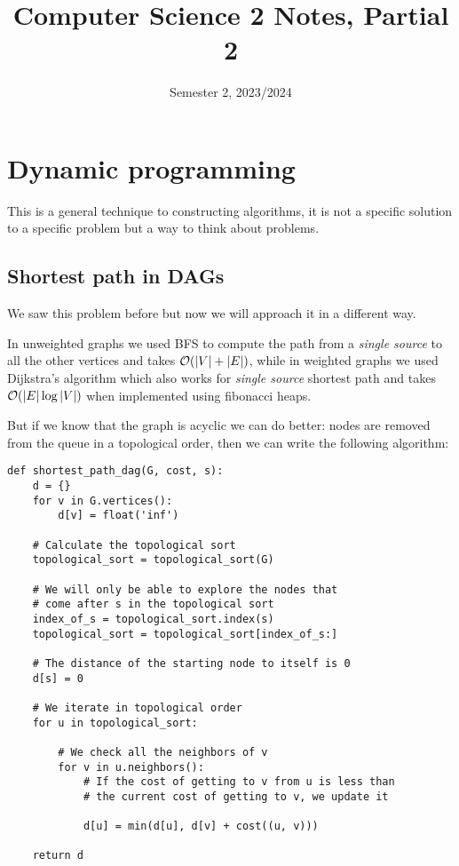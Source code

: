 \documentclass[14pt]{extarticle}
\title{Computer Science 2 Notes, Partial 2}
\date{Semester 2, 2023/2024}
\begin{document}
\maketitle
\tableofcontents
\clearpage

\section{Dynamic programming}

This is a general technique to constructing algorithms, it is not a specific solution to a specific problem but a way to think about problems.

\subsection{Shortest path in DAGs}

We saw this problem before but now we will approach it in a different way.

In unweighted graphs we used BFS to compute the path from a \textit{single source} to all the other vertices and takes $\mathcal{O}(|V| + |E|)$, while in weighted graphs we used Dijkstra's algorithm which also works for \textit{single source} shortest path and takes $\mathcal{O}(|E| \log |V|)$ when implemented using fibonacci heaps.

But if we know that the graph is acyclic we can do better: nodes are removed from the queue in a topological order, then we can write the following algorithm:

\begin{verbatim}
def shortest_path_dag(G, cost, s):
    d = {}
    for v in G.vertices():
        d[v] = float('inf')

    # Calculate the topological sort
    topological_sort = topological_sort(G)

    # We will only be able to explore the nodes that
    # come after s in the topological sort
    index_of_s = topological_sort.index(s)
    topological_sort = topological_sort[index_of_s:]

    # The distance of the starting node to itself is 0
    d[s] = 0

    # We iterate in topological order
    for u in topological_sort:

        # We check all the neighbors of v
        for v in u.neighbors():
            # If the cost of getting to v from u is less than
            # the current cost of getting to v, we update it
            
            d[u] = min(d[u], d[v] + cost((u, v)))

    return d
\end{verbatim}
\end{document}
